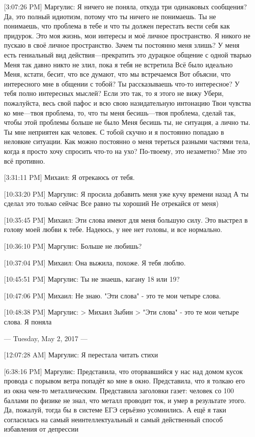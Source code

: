 \documentclass{article}
\begin{document}
[3:07:26 PM] Маргулис:
Я ничего не поняла, откуда три одинаковых сообщения?
 Да, это полный идиотизм, потому что ты ничего не понимаешь. Ты не понимаешь, что проблема в тебе и что ты должен перестать вести себя как придурок.
 Это моя жизнь, мои интересы и моё личное пространство. Я никого не пускаю в своё личное пространство.
 Зачем ты постоянно меня злишь?
 У меня есть гениальный вид действия—прекратить это дурацкое общение с одной тварью
 Меня так давно никто не злил, пока я тебя не встретила
 Всё было идеально
 Меня, кстати, бесит, что все думают, что мы встречаемся
 Вот объясни, что интересного мне в общении с тобой?
 Ты рассказываешь что-то интересное?
 У тебя полно интересных мыслей?
 Если это так, то я этого не вижу
 Убери, пожалуйста, весь свой пафос и всю свою назидательную интонацию
 Твои чувства ко мне—твоя проблема, то, что ты меня бесишь—твоя проблема, сделай так, чтобы этой проблемы больше не было
 Меня бесишь ты, не ситуация, а лично ты. Ты мне неприятен как человек. С тобой скучно и я постоянно попадаю в неловкие ситуации. Как можно постоянно о меня тереться разными частями тела, когда я просто хочу спросить что-то на ухо? По-твоему, это незаметно?
 Мне это всё противно.

[3:31:11 PM] Михаил:
Я отрекаюсь от тебя.

[10:33:20 PM] Маргулис:
Я просила добавить меня уже кучу времени назад
 А ты сделал это только сейчас
 Все равно ты хороший
 Не отрекайся от меня)


[10:35:45 PM] Михаил:
Эти слова имеют для меня большую силу. Это выстрел в голову моей любви к тебе. Надеюсь, у нее нет головы, и все нормально.

[10:36:10 PM] Маргулис:
Больше не любишь?

[10:37:04 PM] Михаил:
Она выжила, похоже. Я тебя люблю.

[10:45:51 PM] Маргулис:
Ты не знаешь, кагану 18 или 19?

[10:47:06 PM] Михаил:
Не знаю.
 "Эти слова" - это те мои четыре слова.

[10:48:38 PM] Маргулис:
> Михаил Зыбин
> "Эти слова" - это те мои четыре слова.
Я поняла

--- Tuesday, May 2, 2017 ---

[12:07:28 AM] Маргулис:
Я перестала читать стихи

[6:38:16 PM] Маргулис:
Представила, что оторвавшийся у нас над домом кусок провода с порывом ветра попадёт ко мне в окно. Представила, что я толкаю его из окна чем-то металлическим. Представила заголовки газет: человек со 100 баллами по физике не знал, что металл проводит ток, и умер в результате этого. Да, пожалуй, тогда бы в системе ЕГЭ серьёзно усомнились.
 А ещё я таки согласилась на самый неинтеллектуальный и самый действенный способ избавления от депрессии
\end{document}

